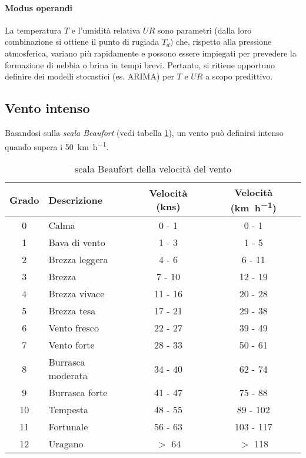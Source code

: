 \paragraph{Modus operandi} La temperatura $T$ e l'umidità relativa $UR$ sono parametri (dalla loro combinazione si ottiene il punto di rugiada $T_d$) che, rispetto alla pressione atmosferica, variano più rapidamente e possono essere impiegati per prevedere la formazione di nebbia o brina in tempi brevi. Pertanto, si ritiene opportuno definire dei modelli stocastici (es. ARIMA) per $T$ e $UR$ a scopo predittivo.

\subsection{Vento intenso}
Basandosi sulla \textit{scala Beaufort} (vedi tabella \ref{Beaufort}), un vento può definirsi intenso quando supera i \SI[per-mode=symbol-or-fraction]{50}{\kilo\meter\per\hour}.
\begin{table}[h!]
	\begin{tabular}{|c|l|c|c|}
		\hline
		\textbf{Grado} & \textbf{Descrizione} & \textbf{Velocità} (\si{\knot}s) & \textbf{Velocità} (\si[per-mode=symbol-or-fraction]{\kilo\meter\per\hour})\\ \hline
		0 & Calma & 0 - 1 & 0 - 1 \\ \hline
		1 & Bava di vento & 1 - 3 & 1 - 5 \\ \hline
		2 & Brezza leggera & 4 - 6 & 6 - 11 \\ \hline
		3 & Brezza & 7 - 10 & 12 - 19 \\ \hline
		4 & Brezza vivace & 11 - 16 & 20 - 28 \\ \hline
		5 & Brezza tesa & 17 - 21 & 29 - 38 \\ \hline
		6 & Vento fresco & 22 - 27 & 39 - 49 \\ \hline
		7 & Vento forte & 28 - 33 & 50 - 61 \\ \hline
		8 & Burrasca moderata & 34 - 40 & 62 - 74 \\ \hline
		9 & Burrasca forte & 41 - 47 & 75 - 88 \\ \hline
		10 & Tempesta & 48 - 55 & 89 - 102 \\ \hline
		11 & Fortunale & 56 - 63 & 103 - 117 \\ \hline
		12 & Uragano & $>$ 64 & $>$ 118 \\ \hline
	\end{tabular}
\centering
\caption{scala Beaufort della velocità del vento}
\label{Beaufort}
\end{table}

